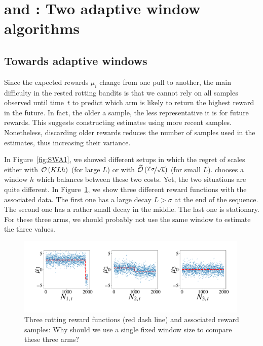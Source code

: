 \section{{\FEWA} and {\RAW}: Two adaptive window algorithms}
\label{sec:algo}
%
\subsection{Towards adaptive windows}
Since the expected rewards $\mu_i$ change from one pull to another, the main difficulty in the rested rotting bandits is that we cannot rely on all samples observed until time~$t$ to predict which arm is likely to return the highest reward in the future. In fact, the older a sample, the less representative it is for future rewards. This suggests constructing estimates using more recent samples. Nonetheless, discarding older rewards reduces the number of samples used in the estimates, thus increasing their variance.

In Figure~\ref{fig:SWA1}, we showed different setups in which the regret of \wSWA scales either with $\mathcal{O}\left(KLh\right)$ (for large $L$) or with $\widetilde{\mathcal{O}}\left(\nicefrac{T\sigma}{\sqrt{h}}\right)$ (for small $L$). \wSWA chooses a window $h$ which balances between these two costs. Yet, the two situations are quite different. In Figure~\ref{fig: adaptive_window}, we show three different reward functions with the associated data. The first one has a large decay $L> \sigma$ at the end of the sequence. The second one has a rather small decay in the middle. The last one is stationary. For these three arms, we should probably not use the same window to estimate the three values.

\begin{figure}[h]
\centering
\includegraphics[clip, width= 0.99\textwidth, trim={ 1cm 2cm 1cm 1cm}]{3Rested/fig/adaptive_windows.pdf}
\caption{Three rotting reward functions (red dash line) and associated reward samples: Why should we use a single fixed window size to compare these three arms?}
\label{fig: adaptive_window}
\end{figure}




